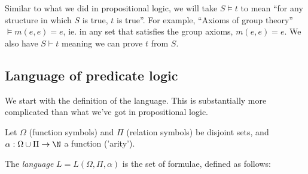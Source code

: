\documentclass[a4paper]{article}
\begin{document}
Similar to what we did in propositional logic, we will take $S\models t$ to mean ``for any structure in which $S$ is true, $t$ is true''. For example, ``Axioms of group theory'' $\models m(e, e) = e$, ie. in any set that satisfies the group axioms, $m(e, e) = e$. We also have $S\vdash t$ meaning we can prove $t$ from $S$.

\subsection{Language of predicate logic}
We start with the definition of the language. This is substantially more complicated than what we've got in propositional logic.
\begin{defi}[Language]
  Let $\Omega$ (function symbols) and $\Pi$ (relation symbols) be disjoint sets, and $\alpha : \Omega\cup\Pi \to \N$ a function ('arity').

  The \emph{language} $L = L(\Omega, \Pi, \alpha)$ is the set of formulae, defined as follows:


\end{defi}
\end{document}
